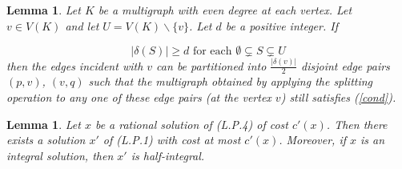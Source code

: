 \documentclass[11pt]{article}
\newtheorem{lemma}[theorem]{Lemma}
\begin{document}
\begin{lemma}\cite{Lov74}\cite[Ex. 6.51]{Lov79}\label{lem:splitting}
Let $K$ be a multigraph with even degree at each vertex.
Let $v\in V(K)$ and let $U=V(K)\backslash \{v\}$.
Let $d$ be a positive integer. If

\begin{equation}\label{cond}
|\delta(S)|\geq d \text{ for each } \emptyset \subsetneq S \subsetneq U
\end{equation}
then the edges incident with $v$ can be partitioned into
$\frac{|\delta(v)|}{2}$ disjoint edge pairs $(p, v)$, $(v, q)$
such that the multigraph obtained by applying
the splitting operation to any one of these edge pairs (at the vertex $v$)
still satisfies (\ref{cond}).
\end{lemma}

\begin{lemma}\label{lem:17trans}
Let $x$ be a rational solution of (L.P.4) of cost $c'(x)$.
Then there exists a solution $x'$ of (L.P.1) with cost at most $c'(x)$.
Moreover, if $x$ is an integral solution, then $x'$ is half-integral.
\end{lemma}
\end{document}
